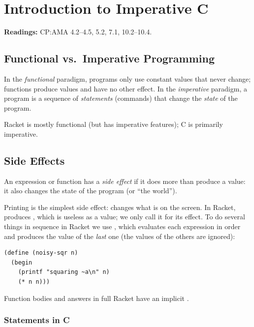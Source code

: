 \chapter{Introduction to Imperative C}

\textbf{Readings:} CP:AMA 4.2--4.5, 5.2, 7.1, 10.2--10.4.

\section{Functional vs.\ Imperative Programming}

\begin{definition}
In the \emph{functional} paradigm, programs only use constant values that never change;
functions produce values and have no other effect. In the \emph{imperative} paradigm, a program
is a sequence of \emph{statements} (commands) that change the \emph{state} of the program.
\end{definition}

Racket is mostly functional (but has imperative features); C is primarily imperative.

\section{Side Effects}

\begin{definition}
An expression or function has a \emph{side effect} if it does more than produce a value: it also
changes the state of the program (or ``the world'').
\end{definition}

Printing is the simplest side effect:  changes what is on the screen. In Racket,
 produces , which is useless as a value; we only call it for its effect.
To do several things in sequence in Racket we use , which evaluates each expression
in order and produces the value of the \emph{last} one (the values of the others are ignored):
\begin{lstlisting}[style=racket]
(define (noisy-sqr n)
  (begin
    (printf "squaring ~a\n" n)
    (* n n)))
\end{lstlisting}
Function bodies and  answers in full Racket have an implicit .

\subsection{Statements in C}

